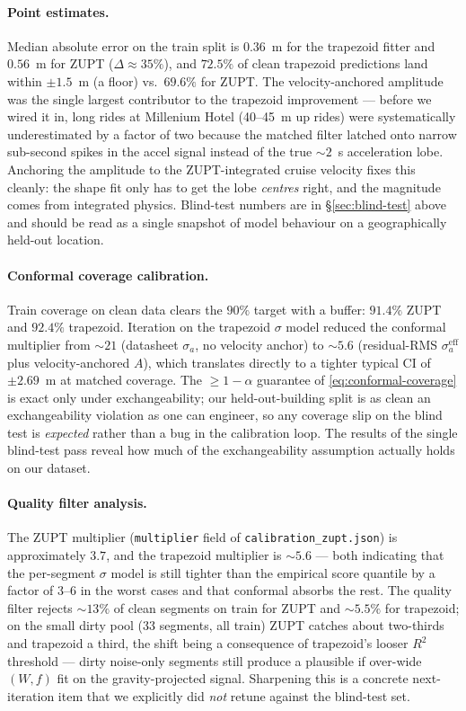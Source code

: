 \paragraph{Point estimates.} Median absolute error on the train
split is $0.36$~m for the trapezoid fitter and $0.56$~m for ZUPT
($\Delta\approx 35\%$), and $72.5\%$ of clean trapezoid predictions
land within $\pm 1.5$~m (a floor) vs.\ $69.6\%$ for ZUPT. The
velocity-anchored amplitude was the single largest contributor to
the trapezoid improvement — before we wired it in, long rides at
Millenium Hotel (40--45~m up rides) were systematically
underestimated by a factor of two because the matched filter latched
onto narrow sub-second spikes in the accel signal instead of the
true $\sim 2$~s acceleration lobe. Anchoring the amplitude to the
ZUPT-integrated cruise velocity fixes this cleanly: the shape fit
only has to get the lobe \emph{centres} right, and the magnitude
comes from integrated physics. Blind-test numbers are in
\S\ref{sec:blind-test} above and should be read as a single snapshot
of model behaviour on a geographically held-out location.

\paragraph{Conformal coverage calibration.} Train coverage on clean
data clears the $90\%$ target with a buffer: $91.4\%$ ZUPT and
$92.4\%$ trapezoid. Iteration on the trapezoid $\sigma$ model
reduced the conformal multiplier from $\sim 21$ (datasheet $\sigma_a$,
no velocity anchor) to $\sim 5.6$ (residual-RMS $\sigma_a^\mathrm{eff}$
plus velocity-anchored $A$), which translates directly to a tighter
typical CI of $\pm 2.69$~m at matched coverage. The $\ge 1-\alpha$
guarantee of \eqref{eq:conformal-coverage} is exact only under
exchangeability; our held-out-building split is as clean an
exchangeability violation as one can engineer, so any coverage slip
on the blind test is \emph{expected} rather than a bug in the
calibration loop. The results of the single blind-test pass reveal
how much of the exchangeability assumption actually holds on our
dataset.

\paragraph{Quality filter analysis.} The ZUPT multiplier
(\texttt{multiplier} field of \texttt{calibration\_zupt.json}) is
approximately $3.7$, and the trapezoid multiplier is $\sim 5.6$ —
both indicating that the per-segment $\sigma$ model is still
tighter than the empirical score quantile by a factor of $3$--$6$
in the worst cases and that conformal absorbs the rest. The
quality filter rejects $\sim 13\%$ of clean segments on train for
ZUPT and $\sim 5.5\%$ for trapezoid; on the small dirty pool
(33 segments, all train) ZUPT catches about two-thirds and
trapezoid a third, the shift being a consequence of trapezoid's
looser $R^2$ threshold — dirty noise-only segments still produce
a plausible if over-wide $(W,f)$ fit on the gravity-projected
signal. Sharpening this is a concrete next-iteration item that we
explicitly did \emph{not} retune against the blind-test set.

